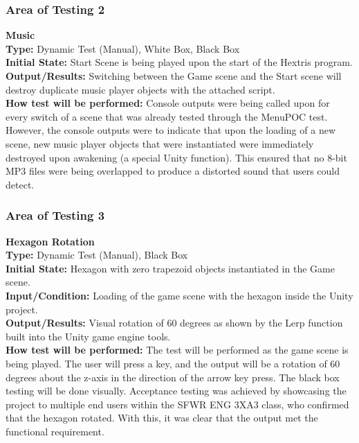 \documentclass[12pt, titlepage]{article}
\begin{document}
\subsubsection{Area of Testing 2}
\noindent \textbf{Music}\\
\textbf{Type:} Dynamic Test (Manual), White Box, Black Box \\
\textbf{Initial State:} Start Scene is being played upon the start of the Hextris program. \\
\textbf{Output/Results:} Switching between the Game scene and the Start scene will destroy duplicate music player objects with the attached script. \\
\textbf{How test will be performed:} Console outputs were being called upon for every switch of a scene that was already tested through the MenuPOC test. However, the console outputs were to indicate that upon the loading of a new scene, new music player objects that were instantiated were immediately destroyed upon awakening (a special Unity function). This ensured that no 8-bit MP3 files were being overlapped to produce a distorted sound that users could detect. 

\subsubsection{Area of Testing 3}
\noindent \textbf{Hexagon Rotation}\\
\textbf{Type:} Dynamic Test (Manual), Black Box \\
\textbf{Initial State:} Hexagon with zero trapezoid objects instantiated in the Game scene. \\
\textbf{Input/Condition:}  Loading of the game scene with the hexagon inside the Unity project.\\
\textbf{Output/Results:}  Visual rotation of 60 degrees as shown by the Lerp function built into the Unity game engine tools.\\
\textbf{How test will be performed:} The test will be performed as the game scene is being played. The user will press a key, and the output will be a rotation of 60 degrees about the z-axis in the direction of the arrow key press. The black box testing will be done visually. Acceptance testing was achieved by showcasing the project to multiple end users within the SFWR ENG 3XA3 class, who confirmed that the hexagon rotated. With this, it was clear that the output met the functional requirement. 
\end{document}
